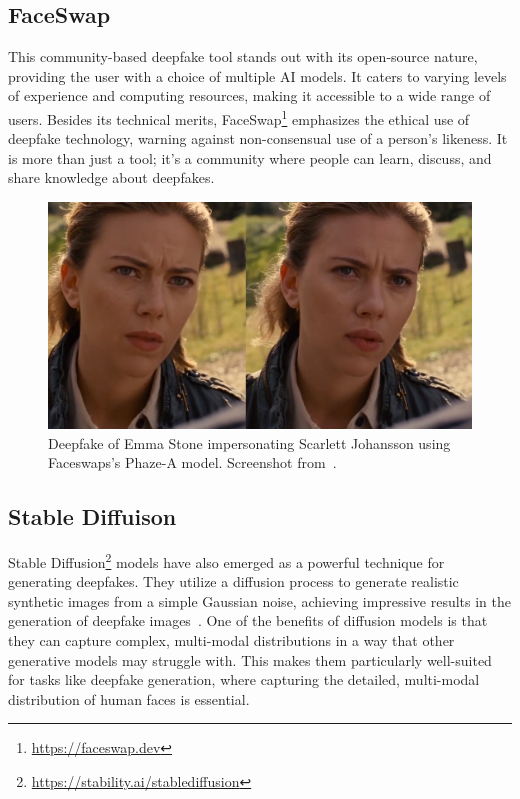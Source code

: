 \subsection{FaceSwap}
This community-based deepfake tool stands out with its open-source nature,
providing the user with a choice of multiple \ac{AI} models. It caters to
varying levels of experience and computing resources, making it accessible
to a wide range of users. Besides its technical merits,
FaceSwap\footnote{\url{https://faceswap.dev}} emphasizes the ethical use
of deepfake technology, warning against non-consensual use of a person's
likeness. It is more than just a tool; it's a community where people can
learn, discuss, and share knowledge about deepfakes.

\begin{figure}[ht]
	\centering
	\includegraphics[scale=0.32]{figures/emma-stone-faceswap}
	\caption{Deepfake of Emma Stone impersonating Scarlett Johansson using
		Faceswaps's Phaze-A model. Screenshot from~\cite{emma-stone-faceswap}.}
\end{figure}

\subsection{Stable Diffuison}\label{sec:stable-diffusion}
Stable Diffusion\footnote{\url{https://stability.ai/stablediffusion}} models have
also emerged as a powerful technique for generating deepfakes.
They utilize a diffusion process to generate realistic synthetic images from a
simple Gaussian noise, achieving impressive results in the generation of
deepfake images~\cite{wu2022unifying}. One of the benefits of diffusion models
is that they can capture complex, multi-modal distributions in a way that
other generative models may struggle with. This makes them particularly
well-suited for tasks like deepfake generation, where capturing the
detailed, multi-modal distribution of human faces is essential.

